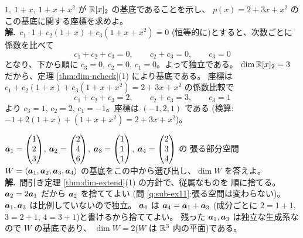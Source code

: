 \begin{rei}[例題・標準(多項式の基底と座標)]\label{rei:dim-poly}
$1,\ 1 + x,\ 1 + x + x^2$ が $\mathbb{R}[x]_2$ の基底であることを示し、
$p(x) = 2 + 3x + x^2$ のこの基底に関する座標を求めよ。\\
\textbf{解.}\ $c_1 \cdot 1 + c_2(1 + x) + c_3(1 + x + x^2) = 0$
(恒等的に)とすると、次数ごとに係数を比べて
\[
c_1 + c_2 + c_3 = 0, \qquad c_2 + c_3 = 0, \qquad c_3 = 0
\]
となり、下から順に $c_3 = 0$, $c_2 = 0$, $c_1 = 0$。よって独立である。
$\dim \mathbb{R}[x]_2 = 3$ だから、定理 \ref{thm:dim-ncheck}(1) により基底である。
座標は $c_1 + c_2(1 + x) + c_3(1 + x + x^2) = 2 + 3x + x^2$ の係数比較で
\[
c_1 + c_2 + c_3 = 2, \qquad c_2 + c_3 = 3, \qquad c_3 = 1
\]
より $c_3 = 1$, $c_2 = 2$, $c_1 = -1$。座標は $(-1, 2, 1)$ である
(検算:$-1 + 2(1 + x) + (1 + x + x^2) = 2 + 3x + x^2$)。
\end{rei}

\begin{rei}[例題・標準(生成系から基底を間引く)]\label{rei:dim-select}
$\bm{a}_1 = \begin{pmatrix}1 \\ 2 \\ 3\end{pmatrix}$, $\bm{a}_2 = \begin{pmatrix}2 \\ 4 \\ 6\end{pmatrix}$,
$\bm{a}_3 = \begin{pmatrix}1 \\ 1 \\ 1\end{pmatrix}$, $\bm{a}_4 = \begin{pmatrix}2 \\ 3 \\ 4\end{pmatrix}$ の
張る部分空間 $W = \langle \bm{a}_1, \bm{a}_2, \bm{a}_3, \bm{a}_4
\rangle$ の基底をこの中から選び出し、$\dim W$ を答えよ。\\
\textbf{解.}\ 間引き定理 \ref{thm:dim-extend}(1) の方針で、従属なものを
順に捨てる。$\bm{a}_2 = 2\bm{a}_1$ だから $\bm{a}_2$ を捨ててよい
(問 \ref{q:sub-ex11}:張る空間は変わらない)。
$\bm{a}_1, \bm{a}_3$ は比例していないので独立。
$\bm{a}_4$ は $\bm{a}_4 = \bm{a}_1 + \bm{a}_3$
(成分ごとに $2 = 1 + 1$, $3 = 2 + 1$, $4 = 3 + 1$)と書けるから捨ててよい。
残った $\bm{a}_1, \bm{a}_3$ は独立な生成系なので $W$ の基底であり、
$\dim W = 2$($W$ は $\mathbb{R}^3$ 内の平面)である。
\end{rei}

